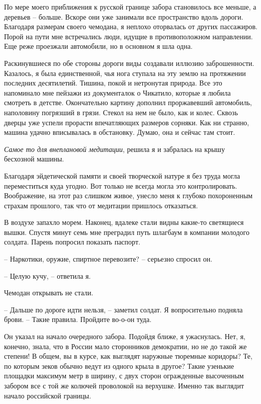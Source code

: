 \documentclass[
]{book}
\begin{document}
По мере моего приближения к русской границе забора становилось все меньше, а деревьев -- больше. Вскоре они уже занимали все пространство вдоль дороги. Благодаря размерам своего чемодана, я неплохо оторвалась от других пассажиров. Порой на пути мне встречались люди, идущие в противоположном направлении. Еще реже проезжали автомобили, но в основном я шла одна.

Раскинувшиеся по обе стороны дороги виды создавали иллюзию заброшенности. Казалось, я была единственной, чья нога ступала на эту землю на протяжении последних десятилетий. Тишина, покой и нетронутая природа. Все это напоминало мне пейзажи из документалок о Чикатило, которые я любила смотреть в детстве. Окончательно картину дополнил проржавевший автомобиль, наполовину погрязший в грязи. Стекол на нем не было, как и колес. Сквозь дверцы уже успели прорасти впечатляющих размеров сорняки. Как ни странно, машина удачно вписывалась в обстановку. Думаю, она и сейчас там стоит.

\emph{Самое то для внеплановой медитации}, решила я и забралась на крышу бесхозной машины.

Благодаря эйдетической памяти и своей творческой натуре я без труда могла переместиться куда угодно. Вот только не всегда могла это контролировать. Воображение, на этот раз слишком живое, унесло меня к глубоко похороненным страхам прошлого, так что от медитации пришлось отказаться.

В воздухе запахло морем. Наконец, вдалеке стали видны какие-то светящиеся вышки. Спустя минут семь мне преградил путь шлагбаум в компании молодого солдата. Парень попросил показать паспорт.

-- Наркотики, оружие, спиртное перевозите? -- серьезно спросил он.

-- Целую кучу, -- ответила я.

Чемодан открывать не стали.

-- Дальше по дороге идти нельзя, -- заметил солдат. Я вопросительно подняла брови. -- Такие правила. Пройдите во-о-он туда.

Он указал на начало очередного забора. Подойдя ближе, я ужаснулась. Нет, я, конечно, знала, что в России мало сторонников демократии, но не до такой же степени! В общем, вы в курсе, как выглядят наружные тюремные коридоры? Те, по которым зеков обычно ведут из одного крыла в другое? Такие узенькие площадки максимум метр в ширину, с двух сторон огражденные высоченным забором все с той же колючей проволокой на верхушке. Именно так выглядит начало российской границы.
\end{document}
